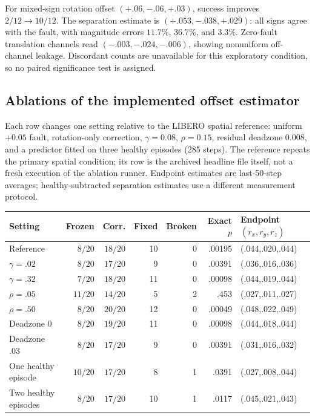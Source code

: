 For mixed-sign rotation offset $(+.06,-.06,+.03)$, success improves $2/12\to10/12$.
The separation estimate is $(+.053,-.038,+.029)$: all signs agree with the fault,
with magnitude errors $11.7\%$, $36.7\%$, and $3.3\%$. Zero-fault translation
channels read $(-.003,-.024,-.006)$, showing nonuniform off-channel leakage.
Discordant counts are unavailable for this exploratory condition, so no paired
significance test is assigned.

\subsection{Ablations of the implemented offset estimator}
\label{app:ablation}

Each row changes one setting relative to the LIBERO spatial reference: uniform
$+0.05$ fault, rotation-only correction, $\gamma=0.08$, $\rho=0.15$, residual deadzone
$0.008$, and a predictor fitted on three healthy episodes (285 steps). The reference
repeats the primary spatial condition; its row is the archived headline file
itself, not a fresh execution of the ablation runner. Endpoint estimates are last-50-step averages;
healthy-subtracted separation estimates use a different measurement protocol.
\begin{center}\small
\begin{tabular}{lrrrrrl}
\toprule
Setting & Frozen & Corr. & Fixed & Broken & Exact $p$ & Endpoint $(r_x,r_y,r_z)$\\
\midrule
Reference & $8/20$ & $18/20$ & 10 & 0 & .00195 & (.044,.020,.044)\\
$\gamma=.02$ & $8/20$ & $17/20$ & 9 & 0 & .00391 & (.036,.016,.036)\\
$\gamma=.32$ & $7/20$ & $18/20$ & 11 & 0 & .00098 & (.044,.019,.044)\\
$\rho=.05$ & $11/20$ & $14/20$ & 5 & 2 & .453 & (.027,.011,.027)\\
$\rho=.50$ & $8/20$ & $20/20$ & 12 & 0 & .00049 & (.048,.022,.049)\\
Deadzone $0$ & $8/20$ & $19/20$ & 11 & 0 & .00098 & (.044,.018,.044)\\
Deadzone $.03$ & $8/20$ & $17/20$ & 9 & 0 & .00391 & (.031,.016,.032)\\
One healthy episode & $10/20$ & $17/20$ & 8 & 1 & .0391 & (.027,.008,.044)\\
Two healthy episodes & $8/20$ & $17/20$ & 10 & 1 & .0117 & (.045,.021,.043)\\
\bottomrule
\end{tabular}
\end{center}
